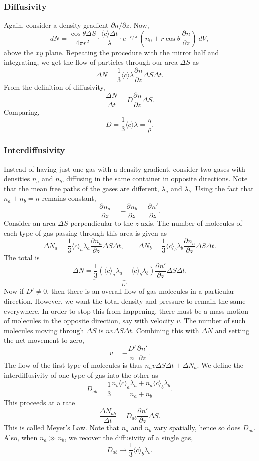 \documentclass[11pt]{article}
\newcommand\pp[3][]{\frac{\partial^{#1}{#2}}{\partial {#3}^{#1}}}
\newcommand\E[1]{\langle #1 \rangle}
\theoremstyle{definition}
\theoremstyle{remark}
\numberwithin{equation}{section}
\begin{document}
    \subsubsection{Diffusivity}
    Again, consider a density gradient $\partial n / \partial z$. Now, \[
        dN = \frac{\cos\theta \Delta S}{4\pi r^2}\cdot \frac{\E{c}\Delta
        t}{\lambda}\cdot e^{-r / \lambda}\,\left(n_0 +
        r\cos\theta\,\pp{n}{z}\right)\:dV,
    \] above the $xy$ plane. Repeating the procedure with the mirror half and
    integrating, we get the flow of particles through our area $\Delta S$ as \[
        \Delta N = \frac{1}{3}\E{c}\lambda \pp{n}{z}\Delta S \Delta t.
    \] From the definition of diffusivity, \[
        \frac{\Delta N}{\Delta t} = D \pp{n}{z}\Delta S.
    \] Comparing, \[
        D = \frac{1}{3}\E{c}\lambda = \frac{\eta}{\rho}.
    \] 

    \subsubsection{Interdiffusivity}
    Instead of having just one gas with a density gradient, consider two gases with
    densities $n_a$ and $n_b$, diffusing in the same container in opposite directions.
    Note that the mean free paths of the gases are different, $\lambda_a$ and
    $\lambda_b$. Using the fact that $n_a + n_b = n$ remains constant, \[
        \pp{n_a}{z} = -\pp{n_b}{z} = \pp{n'}{z}.
    \] Consider an area $\Delta S$ perpendicular to the $z$ axis. The number of
    molecules of each type of gas passing through this area is given as \[
        \Delta N_a = \frac{1}{3}\E{c}_a\lambda_a \pp{n_a}{z}\Delta S \Delta t, \qquad
        \Delta N_b = \frac{1}{3}\E{c}_b\lambda_b \pp{n_a}{z}\Delta S \Delta t.
    \] The total is \[
        \Delta N = \underbrace{\frac{1}{3}\left(\E{c}_a\lambda_a -
        \E{c}_b\lambda_b\right)}_{D'}\pp{n'}{z}\Delta S \Delta t.
    \] Now if $D' \neq 0$, then there is an overall flow of gas molecules in a
    particular direction. However, we want the total density and pressure to remain
    the same everywhere. In order to stop this from happening, there must be a mass
    motion of molecules in the opposite direction, say with velocity $v$. The number
    of such molecules moving through $\Delta S$ is $nv\Delta S \Delta t$. Combining
    this with $\Delta N$ and setting the net movement to zero, \[
        v = -\frac{D'}{n}\pp{n'}{z}.
    \] The flow of the first type of molecules is thus $n_av\Delta S\Delta t + 
    \Delta N_a$. We define the interdiffusivity of one type of gas into the other as \[
        D_{ab} = \frac{1}{3} \frac{n_b\E{c}_a\lambda_a + n_a\E{c}_b\lambda_b}{n_a +
        n_b}.
    \] This proceeds at a rate \[
        \frac{\Delta N_{ab}}{\Delta t} = D_{ab}\pp{n'}{z}\Delta S.
    \] This is called Meyer's Law. Note that $n_a$ and $n_b$ vary spatially, hence
    so does $D_{ab}$. Also, when $n_a \gg n_b$, we recover the diffusivity of a
    single gas, \[
        D_{ab} \to \frac{1}{3}\E{c}_b\lambda_b.
    \]
\end{document}
